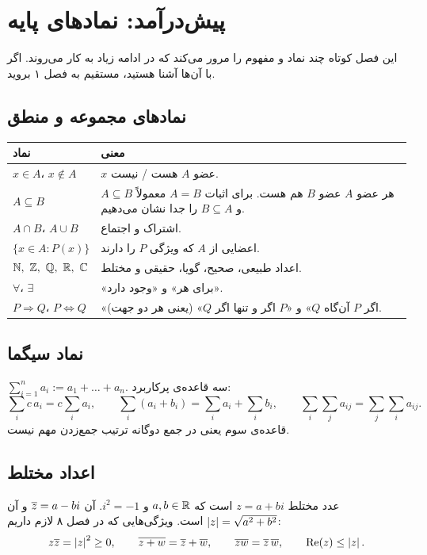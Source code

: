 \chapter{پیش‌درآمد: نمادهای پایه}
\label{ch:prelim}

این فصل کوتاه چند نماد و مفهوم را مرور می‌کند که در ادامه زیاد به کار می‌روند. اگر با آن‌ها آشنا هستید، مستقیم به فصل ۱ بروید.

\section{نمادهای مجموعه و منطق}
\begin{center}
\begin{tabular}{>{\centering\arraybackslash}m{3cm} m{10.2cm}}
\toprule
\textbf{نماد} & \textbf{معنی} \\
\midrule
$x\in A$، $x\notin A$ & $x$ عضو $A$ هست / نیست. \\
$A\subseteq B$ & هر عضو $A$ عضو $B$ هم هست. برای اثبات $A=B$ معمولاً $A\subseteq B$ و $B\subseteq A$ را جدا نشان می‌دهیم. \\
$A\cap B$، $A\cup B$ & اشتراک و اجتماع. \\
$\{x\in A : P(x)\}$ & اعضایی از $A$ که ویژگی $P$ را دارند. \\
$\N,\ \Z,\ \Q,\ \R,\ \C$ & اعداد طبیعی، صحیح، گویا، حقیقی و مختلط. \\
$\forall$، $\exists$ & «برای هر» و «وجود دارد». \\
$P\Rightarrow Q$، $P\Leftrightarrow Q$ & «اگر $P$ آن‌گاه $Q$» و «$P$ اگر و تنها اگر $Q$» (یعنی هر دو جهت). \\
\bottomrule
\end{tabular}
\end{center}

\section{نماد سیگما}
$\sum_{i=1}^{n} a_i:=a_1+\dots+a_n$. سه قاعده‌ی پرکاربرد:
\[
\sum_{i} c\,a_i = c\sum_{i} a_i,\qquad
\sum_{i} (a_i+b_i) = \sum_{i} a_i+\sum_{i} b_i,\qquad
\sum_{i}\sum_{j} a_{ij} = \sum_{j}\sum_{i} a_{ij}.
\]
قاعده‌ی سوم یعنی در جمع دوگانه ترتیب جمع‌زدن مهم نیست.

\section{اعداد مختلط}\label{sec:complex}
عدد مختلط $z=a+bi$ است که $a,b\in\mathbb{R}$ و $i^2=-1$.  آن $\overline{z}=a-bi$ و  آن $\left\lvert z\right\rvert=\sqrt{a^2+b^2}$ است. ویژگی‌هایی که در فصل ۸ لازم داریم:
\[
z\overline{z}=\left\lvert z\right\rvert^2\ge 0,\qquad \overline{z+w}=\overline{z}+\overline{w},\qquad \overline{zw}=\overline{z}\,\overline{w},\qquad \operatorname{Re}(z)\le\left\lvert z\right\rvert.
\]


